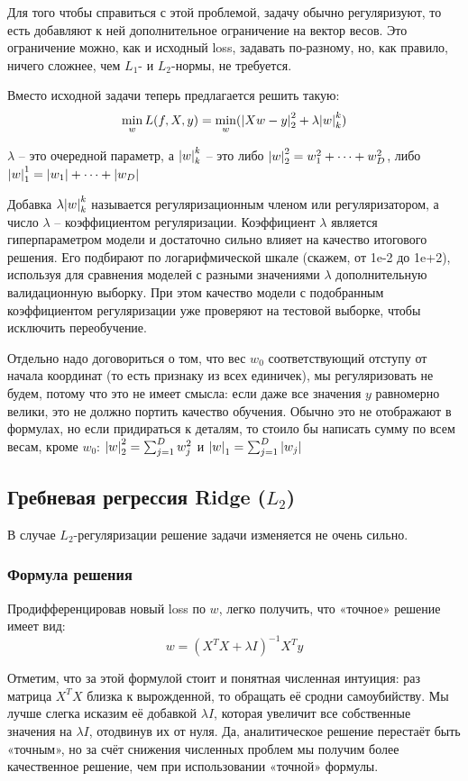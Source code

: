 Для того чтобы справиться с этой проблемой, задачу обычно регуляризуют, то есть добавляют к ней дополнительное
ограничение на вектор весов.
Это ограничение можно, как и исходный loss, задавать по-разному, но, как правило, ничего сложнее, чем $L_1$- и
$L_2$-нормы, не требуется.

Вместо исходной задачи теперь предлагается решить такую:
\[ \min_w L(f,X,y) = \min_w (\abs{X w - y }^2_2 + \lambda \abs{w}_k^k)\]

$\lambda$ -- это очередной параметр, а $\abs{w}_k^k$ -- это либо $\abs{w}_2^2 = w_1^2 + \dots + w_D^2$, либо
$\abs{w}_1^1 = \abs{w_1} + \dots + \abs{w_D}$

Добавка $\lambda \abs{w}_k^k$ называется регуляризационным членом или регуляризатором, а число $\lambda$ --
коэффициентом регуляризации.
Коэффициент $\lambda$ является гиперпараметром модели и достаточно сильно влияет на качество итогового решения.
Его подбирают по логарифмической шкале (скажем, от 1e-2 до 1e+2), используя для сравнения моделей с разными
значениями $\lambda$ дополнительную валидационную выборку.
При этом качество модели с подобранным коэффициентом регуляризации уже проверяют на тестовой выборке, чтобы
исключить переобучение.

Отдельно надо договориться о том, что вес $w_0$ соответствующий отступу от начала координат (то есть признаку из
всех единичек), мы регуляризовать не будем, потому что это не имеет смысла: если даже все значения $y$ равномерно
велики, это не должно портить качество обучения.
Обычно это не отображают в формулах, но если придираться к деталям, то стоило бы написать сумму по всем весам,
кроме $w_0$: $\abs{w}_2^2 = \sum_{j=1}^D w_j^2$ и $\abs{w}_1 = \sum_{j=1}^D \abs{w_j}$

\subsection{Гребневая регрессия Ridge ($L_2$)}

В случае $L_2$-регуляризации решение задачи изменяется не очень сильно.

\subsubsection{Формула решения}
Продифференцировав новый loss по $w$, легко получить, что «точное» решение имеет вид:
\[ w = (X^T X + \lambda I)^{-1} X^T y\]

Отметим, что за этой формулой стоит и понятная численная интуиция: раз матрица $X^T X$ близка к вырожденной, то
обращать её сродни самоубийству.
Мы лучше слегка исказим её добавкой $\lambda I$, которая увеличит все собственные значения на $\lambda I$, отодвинув
их от нуля.
Да, аналитическое решение перестаёт быть «точным», но за счёт снижения численных проблем мы получим более
качественное решение, чем при использовании «точной» формулы.

